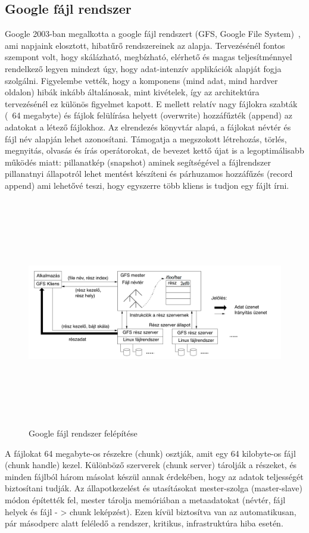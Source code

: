 \documentclass[a4paper,12pt]{article}
\begin{document}
\subsection{Google fájl rendszer}
Google 2003-ban megalkotta a google fájl rendszert (GFS, Google File System)~\parencite{gfs}, ami napjaink elosztott, hibatűrő rendszereinek az alapja. Tervezésénél fontos szempont volt, hogy skálázható, megbízható, elérhető és magas teljesítménnyel rendelkező legyen mindezt úgy, hogy adat-intenzív applikációk alapját fogja szolgálni. Figyelembe vették, hogy a komponens (mind adat, mind hardver oldalon) hibák inkább általánosak, mint kivételek, így az architektúra tervezésénél ez különös figyelmet kapott. E mellett relatív nagy fájlokra szabták (~64 megabyte) és fájlok felülírása helyett (overwrite) 
hozzáfűzték (append) az adatokat a létező fájlokhoz. Az elrendezés könyvtár alapú, a fájlokat névtér és fájl név alapján lehet azonosítani. Támogatja a megszokott létrehozás, törlés, megnyitás, olvasás és írás operátorokat, de bevezet kettő újat is a legoptimálisabb működés miatt: pillanatkép (snapshot) aminek segítségével a fájlrendszer pillanatnyi állapotról lehet mentést készíteni és párhuzamos hozzáfűzés (record append) ami lehetővé teszi, hogy egyszerre több kliens is tudjon egy fájlt írni. 

\begin{figure}[ht!]
\centering
\includegraphics[width=130mm, height=100mm, keepaspectratio]{img/gfs.png}
\caption{Google fájl rendszer felépítése~\parencite{gfs}
\label{gfs}}
\end{figure}

A fájlokat 64 megabyte-os részekre (chunk) osztják, amit egy 64 kilobyte-os fájl (chunk handle) kezel. Különböző szerverek (chunk server) tárolják a részeket, és minden fájlból három másolat készül annak érdekében, hogy az adatok teljességét biztosítani tudják. Az állapotkezelést és utasításokat mester-szolga (master-slave) módon építették fel, mester tárolja memóriában a metaadatokat (névtér, fájl helyek és fájl - > chunk leképzést). Ezen kívül biztosítva van az automatikusan, pár másodperc alatt feléledő a rendszer, kritikus, infrastruktúra hiba esetén.
\end{document}
